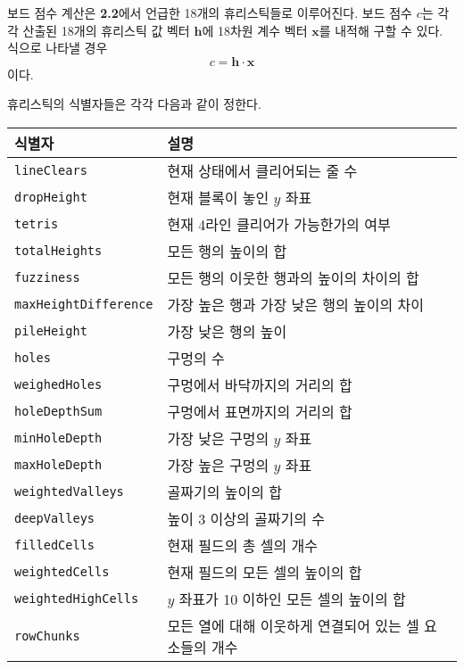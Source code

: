 보드 점수 계산은 \textbf{2.2}에서 언급한 18개의 휴리스틱들로 이루어진다. 보드 점수 $c$는 각각 산출된 18개의 휴리스틱 값 벡터 $\mathbf{h}$에
18차원 계수 벡터 $\mathbf{x}$를 내적해 구할 수 있다. 식으로 나타낼 경우
\[c = \mathbf{h} \cdot \mathbf{x}\]
이다.

휴리스틱의 식별자들은 각각 다음과 같이 정한다.

\begin{tabularx}{\linewidth}{l|X}
    식별자 & 설명 \\
    \hline
    \texttt{lineClears}           & 현재 상태에서 클리어되는 줄 수 \\
    \texttt{dropHeight}           & 현재 블록이 놓인 $y$ 좌표 \\
    \texttt{tetris}               & 현재 4라인 클리어가 가능한가의 여부 \\
    \texttt{totalHeights}         & 모든 행의 높이의 합 \\
    \texttt{fuzziness}            & 모든 행의 이웃한 행과의 높이의 차이의 합 \\
    \texttt{maxHeightDifference}  & 가장 높은 행과 가장 낮은 행의 높이의 차이 \\
    \texttt{pileHeight}           & 가장 낮은 행의 높이 \\
    \texttt{holes}                & 구멍의 수 \\
    \texttt{weighedHoles}         & 구멍에서 바닥까지의 거리의 합 \\
    \texttt{holeDepthSum}         & 구멍에서 표면까지의 거리의 합 \\
    \texttt{minHoleDepth}         & 가장 낮은 구멍의 $y$ 좌표 \\
    \texttt{maxHoleDepth}         & 가장 높은 구멍의 $y$ 좌표 \\
    \texttt{weightedValleys}      & 골짜기의 높이의 합 \\
    \texttt{deepValleys}          & 높이 3 이상의 골짜기의 수 \\
    \texttt{filledCells}          & 현재 필드의 총 셀의 개수 \\
    \texttt{weightedCells}        & 현재 필드의 모든 셀의 높이의 합 \\
    \texttt{weightedHighCells}    & $y$ 좌표가 10 이하인 모든 셀의 높이의 합 \\
    \texttt{rowChunks}            & 모든 열에 대해 이웃하게 연결되어 있는 셀 요소들의 개수 \\
\end{tabularx}

\newpage

